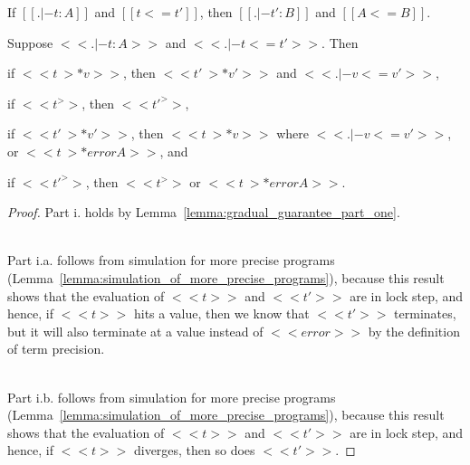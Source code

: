 \begin{theorem}
  \label{thm:gradual_guarantee} 
  \begin{enumR}
  \item[] 
  \item If $[[. |- t : A]]$ and $[[t <= t']]$, then $[[. |- t' : B]]$ and $[[A <= B]]$.
  \item Suppose $<<. |- t : A>>$ and $<<. |- t <= t'>>$. Then
    \begin{enumA}
    \item if $<<t ~>* v>>$, then $<<t' ~>* v'>>$ and $<<. |- v <= v'>>$,
    \item if $<<t ^>>$, then $<<t' ^>>$,
    \item if $<<t' ~>* v'>>$, then $<<t ~>* v>>$ where $<<. |- v <= v'>>$, or $<<t ~>* error A>>$, and
    \item if $<<t' ^>>$, then $<<t ^>>$ or $<<t ~>* error A>>$.
    \end{enumA}
  \end{enumR}
\end{theorem}
\begin{proof}
  Part i. holds by Lemma~\ref{lemma:gradual_guarantee_part_one}.

 \ \\
 \noindent
 Part i.a. follows from simulation for more precise programs
 (Lemma~\ref{lemma:simulation_of_more_precise_programs}), because this
 result shows that the evaluation of $<<t>>$ and $<<t'>>$ are in lock
 step, and hence, if $<<t>>$ hits a value, then we know that $<<t'>>$
 terminates, but it will also terminate at a value instead of
 $<<error>>$ by the definition of term precision.
 
 \ \\
 \noindent
 Part i.b. follows from simulation for more precise programs
 (Lemma~\ref{lemma:simulation_of_more_precise_programs}), because
 this result shows that the evaluation of $<<t>>$ and $<<t'>>$ are in
 lock step, and hence, if $<<t>>$ diverges, then so does $<<t'>>$.
\end{proof}

